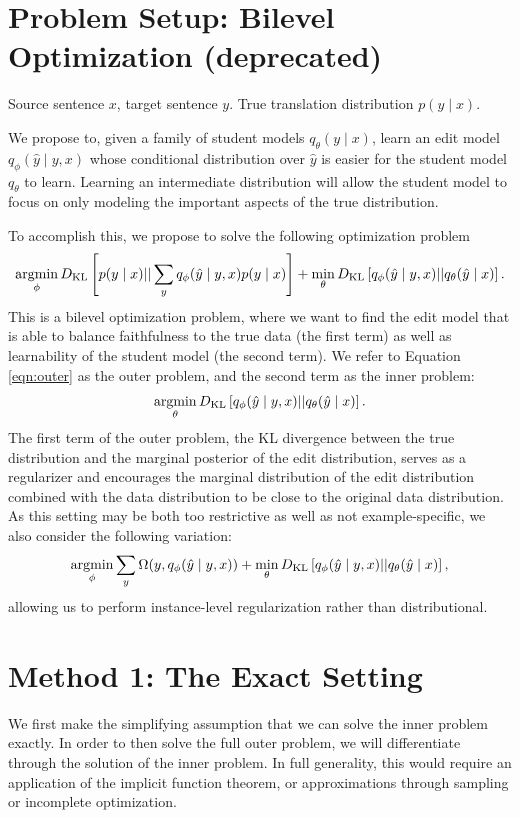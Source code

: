 \documentclass[11pt]{article}
\begin{document}
\section{Problem Setup: Bilevel Optimization (deprecated)}
Source sentence $x$, target sentence $y$.
True translation distribution $p(y \mid x)$.

We propose to, given a family of student models $q_\theta(y \mid x)$,
learn an edit model $q_\phi(\hat{y} \mid y, x)$ whose conditional distribution over $\hat{y}$
is easier for the student model $q_\theta$ to learn.
Learning an intermediate distribution will allow the student model to focus on only modeling
the important aspects of the true distribution.

To accomplish this, we propose to solve the following optimization problem
\begin{equation}
    \label{eqn:outer}
    \operatorname*{argmin}_\phi D_\mathrm{KL}\left[p(y \mid x) || \sum_y q_\phi(\hat{y} \mid y, x)p(y \mid x)\right]
    + \min_\theta D_\mathrm{KL}\left[q_\phi(\hat{y} \mid y, x) || q_\theta(\hat{y} \mid x)\right].
\end{equation}
This is a bilevel optimization problem, where we want to find the edit model
that is able to balance faithfulness to the true data (the first term)
as well as learnability of the student model (the second term).
We refer to Equation \ref{eqn:outer} as the outer problem,
and the second term as the inner problem:
\begin{equation}
    \label{eqn:inner}
    \operatorname*{argmin}_\theta D_\mathrm{KL}\left[q_\phi(\hat{y} \mid y, x) || q_\theta(\hat{y} \mid x)\right].
\end{equation}
The first term of the outer problem, the KL divergence between the true distribution
and the marginal posterior of the edit distribution,
serves as a regularizer and encourages the marginal distribution of
the edit distribution combined with the data distribution to be close to the
original data distribution.
As this setting may be both too restrictive as well as not example-specific,
we also consider the following variation:
\begin{equation}
    \label{eqn:regularized-bilevel}
    \operatorname*{argmin}_\phi \sum_y \Omega(y, q_\phi(\hat{y} \mid y, x))
    + \min_\theta D_\mathrm{KL}\left[q_\phi(\hat{y} \mid y, x) || q_\theta(\hat{y} \mid x)\right],
\end{equation}
allowing us to perform instance-level regularization rather than distributional.

\section{Method 1: The Exact Setting}
We first make the simplifying assumption that we can solve the inner problem exactly.
In order to then solve the full outer problem, we will differentiate through the solution of the
inner problem.
In full generality, this would require an application of the implicit function theorem,
or approximations through sampling or incomplete optimization.
\end{document}
